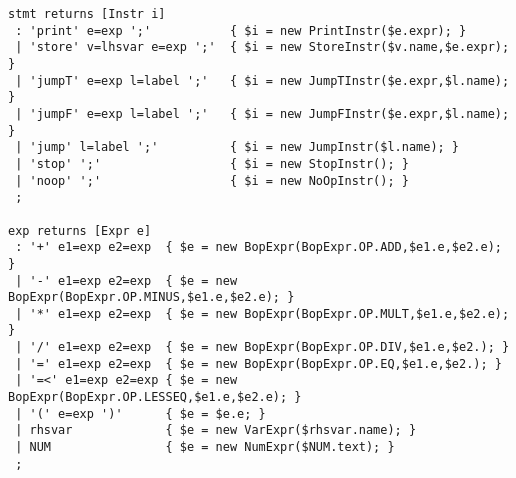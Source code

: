 \begin{minipage}{5in}
\begin{lstlisting}[frame=single,language=antlr]
stmt returns [Instr i]
 : 'print' e=exp ';'           { $i = new PrintInstr($e.expr); }
 | 'store' v=lhsvar e=exp ';'  { $i = new StoreInstr($v.name,$e.expr); }
 | 'jumpT' e=exp l=label ';'   { $i = new JumpTInstr($e.expr,$l.name); }
 | 'jumpF' e=exp l=label ';'   { $i = new JumpFInstr($e.expr,$l.name); }
 | 'jump' l=label ';'          { $i = new JumpInstr($l.name); }
 | 'stop' ';'                  { $i = new StopInstr(); }
 | 'noop' ';'                  { $i = new NoOpInstr(); }
 ;

exp returns [Expr e]
 : '+' e1=exp e2=exp  { $e = new BopExpr(BopExpr.OP.ADD,$e1.e,$e2.e); }
 | '-' e1=exp e2=exp  { $e = new BopExpr(BopExpr.OP.MINUS,$e1.e,$e2.e); }
 | '*' e1=exp e2=exp  { $e = new BopExpr(BopExpr.OP.MULT,$e1.e,$e2.e); }
 | '/' e1=exp e2=exp  { $e = new BopExpr(BopExpr.OP.DIV,$e1.e,$e2.); }
 | '=' e1=exp e2=exp  { $e = new BopExpr(BopExpr.OP.EQ,$e1.e,$e2.); }
 | '=<' e1=exp e2=exp { $e = new BopExpr(BopExpr.OP.LESSEQ,$e1.e,$e2.e); }
 | '(' e=exp ')'      { $e = $e.e; }
 | rhsvar             { $e = new VarExpr($rhsvar.name); }
 | NUM                { $e = new NumExpr($NUM.text); }
 ;
\end{lstlisting}
\end{minipage}
